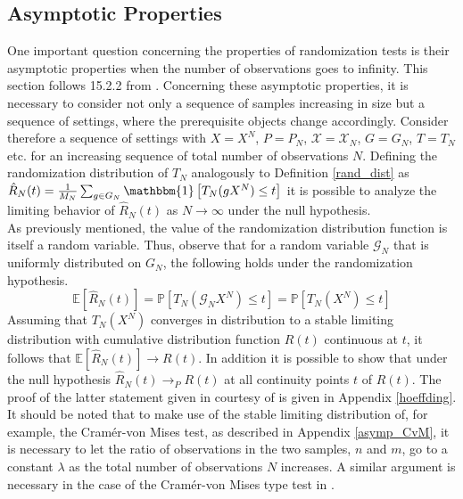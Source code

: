 \documentclass[12pt, a4paper]{article}
\theoremstyle{MAstyle} \newtheorem{assumption}{Assumption}[section]
\theoremstyle{MAstyle} \newtheorem{definition}{Definition}[section]
\theoremstyle{MAstyle} \newtheorem{theorem}{Theorem}[section]
\begin{document}
	
		
		\subsection{Asymptotic Properties}
			One important question concerning the properties of randomization tests is their asymptotic properties when the number of observations goes to infinity. This section follows 15.2.2 from \cite{lehmann_testing_2005}. Concerning these asymptotic properties, it is necessary to consider not only a sequence of samples increasing in size but a sequence of settings, where the prerequisite objects change accordingly. Consider therefore a sequence of settings with $X = X^N$, $P = P_N$, $\mathcal{X} = \mathcal{X}_N$, $G = G_N$, $T = T_N$ etc. for an increasing sequence of total number of observations $N$.
			Defining the randomization distribution of $T_N$ analogously to Definition \ref{rand_dist} as $\hat{R}_N(t) = \frac{1}{M_N} \sum_{g \in G_N} \mathbbm{1} \left[T_N(gX^N) \leq t\right]$ it is possible to analyze the limiting behavior of $\hat{R}_N(t)$ as $N \rightarrow \infty$ under the null hypothesis.\\
			As previously mentioned, the value of the randomization distribution function is itself a random variable. Thus, observe that for a random variable $\mathcal{G}_N$ that is uniformly distributed on $G_N$, the following holds under the randomization hypothesis.
			\begin{equation}
				\mathbb{E}[\hat{R}_N(t)] = \mathbb{P}\left[T_N(\mathcal{G}_NX^N) \leq t\right] = \mathbb{P}\left[T_N(X^N) \leq t\right]
			\end{equation}
			Assuming that $T_N(X^N)$ converges in distribution to a stable limiting distribution with cumulative distribution function $R(t)$ continuous at $t$, it follows that $\mathbb{E}[\hat{R}_N(t)] \rightarrow R(t)$. In addition it is possible to show that under the null hypothesis $\hat{R}_N(t) \rightarrow_P R(t)$ at all continuity points $t$ of $R(t)$. The proof of the latter statement given in \cite{lehmann_testing_2005} courtesy of \cite{hoeffding_large-sample_1952} is given in Appendix \ref{hoeffding}.\\
			
			It should be noted that to make use of the stable limiting distribution of, for example, the Cram\'{e}r-von Mises test, as described in Appendix \ref{asymp_CvM}, it is necessary to let the ratio of observations in the two samples, $n$ and $m$, go to a constant $\lambda$ as the total number of observations $N$ increases. A similar argument is necessary in the case of the Cram\'{e}r-von Mises type test in \cite{bugni_permutation_2021}.
		
\end{document}
